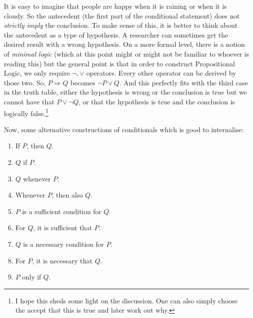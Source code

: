 It is easy to imagine that people are happy when it is raining or when it is cloudy. So the antecedent (the first part of the conditional statement) does not \emph{strictly imply} the conclusion. To make sense of this, it is better to think about the antecedent as a type of hypothesis. A researcher can sometimes get the desired result with a wrong hypothesis. On a more formal level, there is a notion of \emph{minimal logic} (which at this point might or might not be familiar to whoever is reading this) but the general point is that in order to construct Propositional Logic, we only require $\neg, \lor$ operators. Every other operator can be derived by those two. So, $P\Rightarrow Q$ becomes $\neg P\lor Q$. And this perfectly fits with the third case in the truth table, either the hypothesis is wrong or the conclusion is true but we cannot have that $P\lor \neg Q$, or that the hypothesis is true and the conclusion is logically false.\footnote{I hope this sheds some light on the discussion. One can also simply choose the accept that this is true and later work out why.}

Now, some alternative constructions of conditionals which is good to internalise:
\begin{enumerate}
    \item If $P$, then $Q$. 
    \item $Q$ if $P$. 
    \item $Q$ whenever $P$. 
    \item Whenever $P$, then also $Q$. 
    \item $P$ is a sufficient condition for $Q$. 
    \item For $Q$, it is sufficient that $P$. 
    \item $Q$ is a necessary condition for $P$. 
    \item For $P$, it is necessary that $Q$. 
    \item $P$ only if $Q$. 
\end{enumerate}

